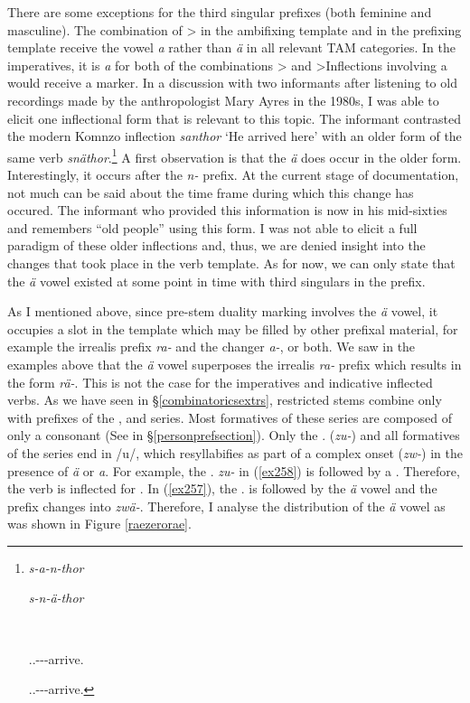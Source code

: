 There are some exceptions for the third singular prefixes (both feminine and masculine). The combination of \Sg>\Tsg{} in the ambifixing template and \Tsg{} in the prefixing template receive the vowel \emph{a} rather than \emph{ä} in all relevant TAM categories. In the imperatives, it is \emph{a} for both of the combinations \Sg>\Tsg{} and \Pl>\Tsg Inflections involving a   would receive a  marker. In a discussion with two informants after listening to old recordings made by the anthropologist Mary Ayres in the 1980s, I was able to elicit one inflectional form that is relevant to this topic. The informant contrasted the modern Komnzo inflection \emph{santhor} `He arrived here' with an older form of the same verb \emph{snäthor}.\footnote{\parbox{0.02cm}{\hfill}\parbox{6cm}{\emph{s-a-n-thor}} \parbox{5cm}{\emph{s-n-ä-thor}}\\ \parbox{0.001cm}{\hfill}\parbox{6cm}{\Tsg.\Masc.\Gam-\Ndu-\Venit-arrive.{\Rs}}  \parbox{15cm}{\Tsg.\Masc.\Gam-\Venit-\Ndu-arrive.\Rs}} A first observation is that the \emph{ä} does occur in the older form. Interestingly, it occurs after the  \emph{n-} prefix. At the current stage of documentation, not much can be said about the time frame during which this change has occured. The informant who provided this information is now in his mid-sixties and remembers ``old people'' using this form. I was not able to elicit a full paradigm of these older inflections and, thus, we are denied insight into the changes that took place in the verb template. As for now, we can only state that the  \emph{ä} vowel existed at some point in time with third singulars in the prefix.

As I mentioned above, since pre-stem duality marking involves the \emph{ä} vowel, it occupies a slot in the template which may be filled by other prefixal material, for example the irrealis prefix \emph{ra-} and the  changer \emph{a-}, or both. We saw in the examples above that the  \emph{ä} vowel superposes the irrealis \emph{ra-} prefix which results in the form \emph{rä-}. This is not the case for the imperatives and indicative inflected verbs. As we have seen in {\S}\ref{combinatoricsextrs}, restricted stems combine only with prefixes of the \Bet{}, \Betatwo{} and \Gam{} series. Most formatives of these series are composed of only a consonant (See  in {\S}\ref{personprefsection}). Only the \Fsg.\Gam{} (\emph{zu-}) and all formatives of the \Betatwo{} series end in /u/, which resyllabifies as part of a complex onset (\emph{zw-}) in the presence of \emph{ä} or \emph{a}. For example, the \Fsg.\Gam{} \emph{zu-} in (\ref{ex258}) is followed by a . Therefore, the verb is inflected for . In (\ref{ex257}), the \Fsg.\Gam{} is followed by the  \emph{ä} vowel and the prefix changes into \emph{zwä-}. Therefore, I analyse the distribution of the \emph{ä} vowel as was shown in Figure \ref{raezerorae}.

